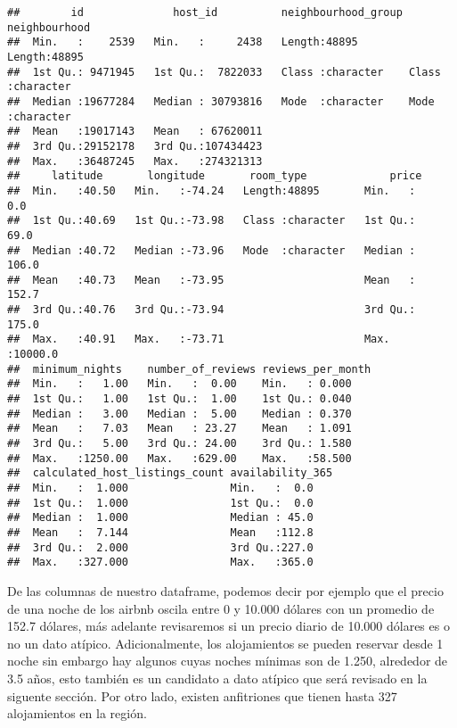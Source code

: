 \documentclass[
]{book}
\begin{document}
\begin{verbatim}
##        id              host_id          neighbourhood_group neighbourhood     
##  Min.   :    2539   Min.   :     2438   Length:48895        Length:48895      
##  1st Qu.: 9471945   1st Qu.:  7822033   Class :character    Class :character  
##  Median :19677284   Median : 30793816   Mode  :character    Mode  :character  
##  Mean   :19017143   Mean   : 67620011                                         
##  3rd Qu.:29152178   3rd Qu.:107434423                                         
##  Max.   :36487245   Max.   :274321313                                         
##     latitude       longitude       room_type             price        
##  Min.   :40.50   Min.   :-74.24   Length:48895       Min.   :    0.0  
##  1st Qu.:40.69   1st Qu.:-73.98   Class :character   1st Qu.:   69.0  
##  Median :40.72   Median :-73.96   Mode  :character   Median :  106.0  
##  Mean   :40.73   Mean   :-73.95                      Mean   :  152.7  
##  3rd Qu.:40.76   3rd Qu.:-73.94                      3rd Qu.:  175.0  
##  Max.   :40.91   Max.   :-73.71                      Max.   :10000.0  
##  minimum_nights    number_of_reviews reviews_per_month
##  Min.   :   1.00   Min.   :  0.00    Min.   : 0.000   
##  1st Qu.:   1.00   1st Qu.:  1.00    1st Qu.: 0.040   
##  Median :   3.00   Median :  5.00    Median : 0.370   
##  Mean   :   7.03   Mean   : 23.27    Mean   : 1.091   
##  3rd Qu.:   5.00   3rd Qu.: 24.00    3rd Qu.: 1.580   
##  Max.   :1250.00   Max.   :629.00    Max.   :58.500   
##  calculated_host_listings_count availability_365
##  Min.   :  1.000                Min.   :  0.0   
##  1st Qu.:  1.000                1st Qu.:  0.0   
##  Median :  1.000                Median : 45.0   
##  Mean   :  7.144                Mean   :112.8   
##  3rd Qu.:  2.000                3rd Qu.:227.0   
##  Max.   :327.000                Max.   :365.0
\end{verbatim}

De las columnas de nuestro dataframe, podemos decir por ejemplo que el precio de una noche de los airbnb oscila entre 0 y 10.000 dólares con un promedio de 152.7 dólares, más adelante revisaremos si un precio diario de 10.000 dólares es o no un dato atípico. Adicionalmente, los alojamientos se pueden reservar desde 1 noche sin embargo hay algunos cuyas noches mínimas son de 1.250, alrededor de 3.5 años, esto también es un candidato a dato atípico que será revisado en la siguente sección. Por otro lado, existen anfitriones que tienen hasta 327 alojamientos en la región.
\end{document}
